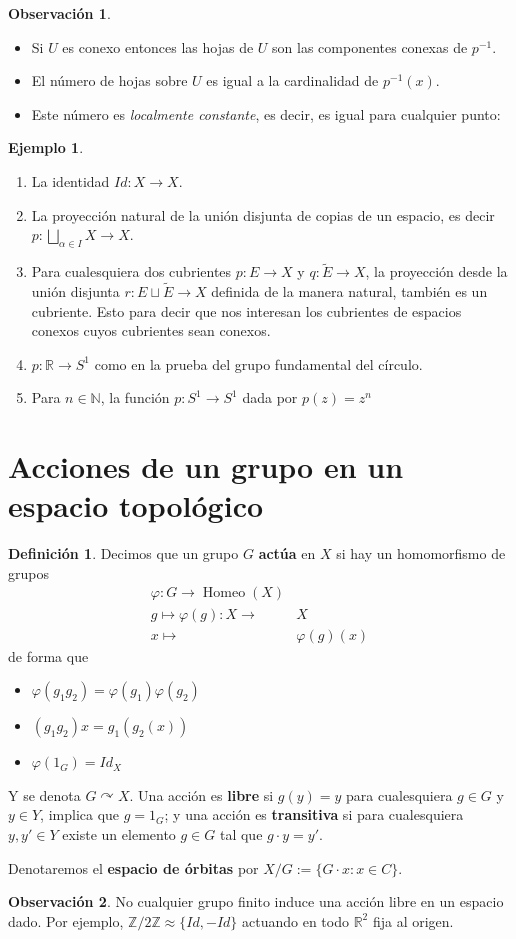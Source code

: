\documentclass[spanish]{article}
\theoremstyle{definition}
\newtheorem*{defn}{Definición}
\newtheorem*{obs}{Observación}
\newtheorem*{ejem}{Ejemplo}
\newcommand{\R}{\mathbb{R}}
\newcommand{\Z}{\mathbb{Z}}
\newcommand{\N}{\mathbb{N}}
\DeclareMathOperator{\Homeo}{Homeo}
\begin{document}
\begin{obs}\leavevmode
	\begin{itemize}
		\item Si $U$ es conexo entonces las hojas de $U$ son las componentes conexas de $p^{-1}$.
		\item El número de hojas sobre $U$ es igual a la cardinalidad de $p^{-1}(x)$.
		\item Este número es \textit{localmente constante}, es decir, es igual para cualquier punto:
	\end{itemize}
\end{obs}\vspace{1cm}

\begin{ejem}\leavevmode
	\begin{enumerate}
		\item La identidad $Id:X\to X$.
		\item La proyección natural de la unión disjunta de copias de un espacio, es decir $p:\bigsqcup_{\alpha\in I}X\to X$.
		\item Para cualesquiera dos cubrientes $p: E\to X$ y $q:\tilde{E}\to X$, la proyección desde la unión disjunta $r: E\sqcup\tilde{E}\to X$ definida de la manera natural, también es un cubriente. Esto para decir que nos interesan los cubrientes de espacios conexos cuyos cubrientes sean conexos.
		\item $p:\R\to S^1$ como en la prueba del grupo fundamental del círculo.
		\item Para $n\in\N$, la función	$p:S^1\to S^1$ dada por $p(z)=z^n$
	\end{enumerate}
\end{ejem}
\section{Acciones de un grupo en un espacio topológico}
\begin{defn}
	Decimos que un grupo $G$ \textbf{actúa} en $X$ si hay un homomorfismo de grupos
	\begin{align*}
		\varphi:G\to\Homeo(X)\\
		g\mapsto\varphi(g):X\to &X\\
		x\mapsto&\varphi(g)(x)
	\end{align*}
	de forma que
	\begin{itemize}
		\item  $\varphi(g_1g_2)=\varphi(g_1)\varphi(g_2)$
		\item $(g_1g_2)x=g_1(g_2(x))$
		\item $\varphi(1_G)=Id_X$
	\end{itemize}
	Y se denota $G\curvearrowright X$. Una acción es \textbf{libre} si $g(y)=y$ para cualesquiera $g\in G$ y $y\in Y$, implica que $g=1_G$; y una acción es \textbf{transitiva} si para cualesquiera $y,y'\in Y$ existe un elemento $g\in G$ tal que $g\cdot y=y'$.
	
	Denotaremos el \textbf{espacio de órbitas} por $X/G:=\{G\cdot x:x\in C\}$.
\end{defn}
\begin{obs}
	No cualquier grupo finito induce una acción libre en un espacio dado. Por ejemplo, $\Z/2\Z\approx\{Id,-Id\}$ actuando en todo $\R^2$ fija al origen.
\end{obs}
\end{document}
